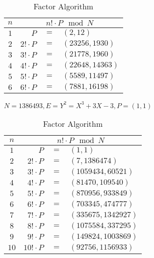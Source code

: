 \documentclass[12pt]{article}
\begin{document}
\solution
\begin{table}[!ht]
    \centering
    \begin{tabular}{|c|rcl|}
        \hline
        $n$ & \multicolumn{3}{c|}{$n!\cdot P\mod{N}$}                         \\ \hline
        $1$ & $P$                                     & $=$ & $(2,12)$        \\ \hline
        $2$ & $2!\cdot P$                             & $=$ & $(23256,1930)$  \\ \hline
        $3$ & $3!\cdot P$                             & $=$ & $(21778,1960)$  \\ \hline
        $4$ & $4!\cdot P$                             & $=$ & $(22648,14363)$ \\ \hline
        $5$ & $5!\cdot P$                             & $=$ & $(5589,11497)$  \\ \hline
        $6$ & $6!\cdot P$                             & $=$ & $(7881,16198)$  \\ \hline
    \end{tabular}
    \caption{Factor Algorithm}
\end{table}

\newpage
\subproblem $N=1386493,E=Y^2=X^3+3X-3,P=(1,1)$

\solution
\begin{table}[!ht]
    \centering
    \begin{tabular}{|c|rcl|}
        \hline
        $n$  & \multicolumn{3}{c|}{$n!\cdot P\mod{N}$}                            \\ \hline
        $1$  & $P$                                     & $=$ & $(1,1)$            \\ \hline
        $2$  & $2!\cdot P$                             & $=$ & $(7,1386474)$      \\ \hline
        $3$  & $3!\cdot P$                             & $=$ & $(1059434,60521)$  \\ \hline
        $4$  & $4!\cdot P$                             & $=$ & $(81470,109540)$   \\ \hline
        $5$  & $5!\cdot P$                             & $=$ & $(870956,933849)$  \\ \hline
        $6$  & $6!\cdot P$                             & $=$ & $(703345,474777)$  \\ \hline
        $7$  & $7!\cdot P$                             & $=$ & $(335675,1342927)$ \\ \hline
        $8$  & $8!\cdot P$                             & $=$ & $(1075584,337295)$ \\ \hline
        $9$  & $9!\cdot P$                             & $=$ & $(149824,1003869)$ \\ \hline
        $10$ & $10!\cdot P$                            & $=$ & $(92756,1156933)$  \\ \hline
    \end{tabular}
    \caption{Factor Algorithm}
\end{table}
\end{document}
